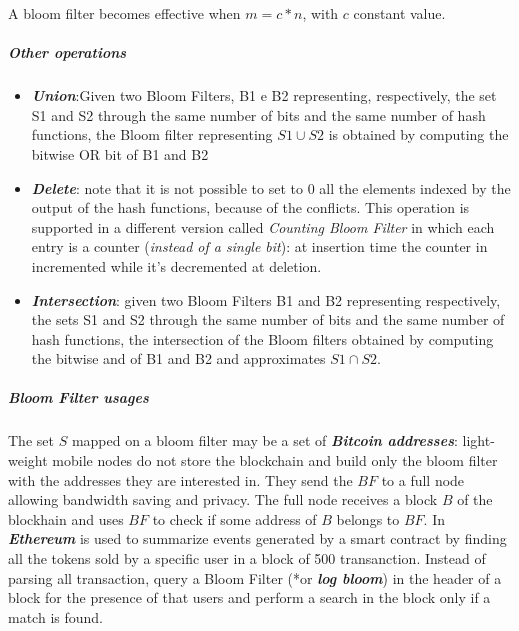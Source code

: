 \documentclass[10pt,a4paper]{report}
\begin{document}
A bloom filter becomes effective when $m =  c*n$, with $c$ constant value.
\subparagraph{Other operations}\label{sec:other-operations}\begin{itemize}
	\item 
	\textit{\textbf{Union}}:Given two Bloom Filters, B1 e B2 representing, respectively, the set S1 and S2 through the same number of bits and the same number of hash functions, the Bloom filter representing $S1 \cup S2$ is obtained by computing the bitwise OR bit of B1 and B2
	\item 
	\textit{\textbf{Delete}}: note that it is not possible to set to $0$ all the elements indexed by the output of the hash functions, because of the conflicts. This operation is supported in a different version called \textit{Counting Bloom Filter} in which each entry is a counter (\textit{instead of a single bit}): at insertion time the counter in incremented while it's decremented at deletion.
	\item 
	\textit{\textbf{Intersection}}: given two Bloom Filters B1 and B2 representing respectively, the sets S1 and S2 through the same number of bits and the same number of hash functions, the intersection of the Bloom filters obtained by computing the bitwise and of B1 and B2 and approximates $S1  \cap S2$.
\end{itemize}
\subparagraph{Bloom Filter usages}\label{sec:bloom-filter-usages}
The set $S$ mapped on a bloom filter may be a set of \textit{\textbf{Bitcoin addresses}}: light-weight mobile nodes do not store the blockchain and build only the bloom filter with the addresses they are interested in. They send the $BF$ to a full node allowing bandwidth saving and privacy. The full node receives  a block $B$ of the blockhain and uses $BF$ to check if some address of $B$ belongs to $BF$.
In \textit{\textbf{Ethereum}} is used to summarize events generated by a smart contract by finding all the tokens sold by a specific user in a block of 500 transanction. Instead of parsing all transaction, query a Bloom Filter (*or \textit{\textbf{log bloom}}) in the header of a block for the presence of that users and perform a search in the block only if a match is found.
\end{document}
